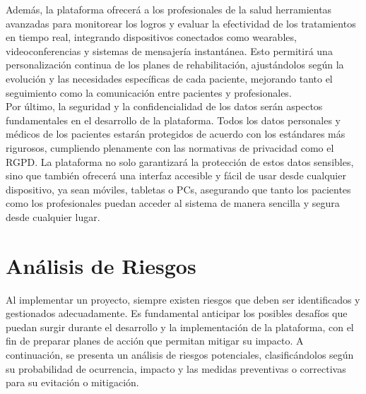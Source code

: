 \documentclass{article}
\begin{document}
Además, la plataforma ofrecerá a los profesionales de la salud herramientas avanzadas para monitorear los logros y evaluar la efectividad de los tratamientos en tiempo real, integrando dispositivos conectados como wearables, videoconferencias y sistemas de mensajería instantánea. Esto permitirá una personalización continua de los planes de rehabilitación, ajustándolos según la evolución y las necesidades específicas de cada paciente, mejorando tanto el seguimiento como la comunicación entre pacientes y profesionales.
\\

Por último, la seguridad y la confidencialidad de los datos serán aspectos fundamentales en el desarrollo de la plataforma. Todos los datos personales y médicos de los pacientes estarán protegidos de acuerdo con los estándares más rigurosos, cumpliendo plenamente con las normativas de privacidad como el RGPD. La plataforma no solo garantizará la protección de estos datos sensibles, sino que también ofrecerá una interfaz accesible y fácil de usar desde cualquier dispositivo, ya sean móviles, tabletas o PCs, asegurando que tanto los pacientes como los profesionales puedan acceder al sistema de manera sencilla y segura desde cualquier lugar.
	
	
	\section{Análisis de Riesgos}
	
	Al implementar un proyecto, siempre existen riesgos que deben ser identificados y gestionados adecuadamente. Es fundamental anticipar los posibles desafíos que puedan surgir durante el desarrollo y la implementación de la plataforma, con el fin de preparar planes de acción que permitan mitigar su impacto. A continuación, se presenta un análisis de riesgos potenciales, clasificándolos según su probabilidad de ocurrencia, impacto y las medidas preventivas o correctivas para su evitación o mitigación.
	
\end{document}
